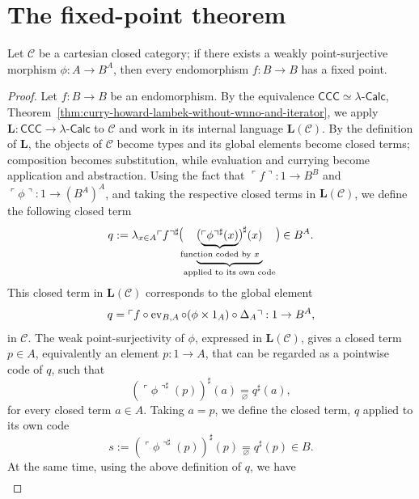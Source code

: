 \section{The fixed-point theorem}

\begin{theorem}
    Let $\mathcal C$ be a cartesian closed category; if there exists a weakly point-surjective morphism $\phi : A \to B^A$, then every endomorphism $f: B \to B$ has a fixed point.
\end{theorem}

\begin{proof}
    Let $f : B \to B$ be an endomorphism.
    By the equivalence $\mathsf{CCC} \simeq \lambda\text{-}\mathsf{Calc}$, Theorem~\ref{thm:curry-howard-lambek-without-wnno-and-iterator}, we apply $\mathbf L : \mathsf{CCC} \to \lambda\text{-}\mathsf{Calc}$ to $\mathcal C$ and work in its internal language $\mathbf L(\mathcal C)$.
    By the definition of $\mathbf L$, the objects of $\mathcal C$ become types and its global elements become closed terms; composition becomes substitution, while evaluation and currying become application and abstraction.
    Using the fact that $\ulcorner f \urcorner : 1 \to B^B$ and $\ulcorner \phi \urcorner : 1 \to (B^A)^A$, and taking the respective closed terms in $\mathbf L(\mathcal C)$, we define the following closed term
    \[ q := \lambda_{x \in A} \ulcorner f \urcorner^\sharp \mathopen{\scalebox{1}[1.35]{$($}}\underbrace{\mathopen{\scalebox{1}[1.15]{$($}}\underbrace{\ulcorner \phi \urcorner^\sharp(x)}_{\makebox[0pt][c]{$\scriptstyle\text{function coded by }x$}}\mathclose{\scalebox{1}[1.15]{$)$}}^\sharp(x)}_{\text{applied to its own code}}\mathclose{\scalebox{1}[1.35]{$)$}} \in B^A. \]
    This closed term in $\mathbf L(\mathcal C)$ corresponds to the global element
    \[ q = \ulcorner f \circ \operatorname{ev}_{B,A} \circ (\phi \times 1_A) \circ \Delta_A \urcorner : 1 \to B^A, \]
    in $\mathcal C$. The weak point-surjectivity of $\phi$, expressed in $\mathbf L(\mathcal C)$, gives a closed term $p \in A$, equivalently an element $p : 1 \to A$, that can be regarded as a pointwise code of $q$, such that
    \[ \left(\ulcorner \phi \urcorner^\sharp(p)\right)^\sharp(a) \underset{\varnothing}{=} q^\sharp(a), \]
    for every closed term $a \in A$. Taking $a=p$, we define the closed term, $q$ applied to its own code
    \[ s := \left(\ulcorner \phi \urcorner^\sharp(p)\right)^\sharp(p) \underset{\varnothing}{=} q^\sharp(p) \in B. \]
    At the same time, using the above definition of $q$, we have
    \begin{align*}

\end{align*}
\end{proof}
